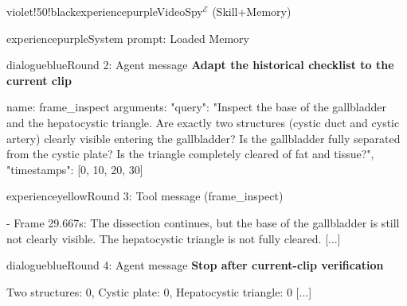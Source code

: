 \begin{ExecutionBox}[breakable,title after break={VideoSpy$^{\mathcal{E}}$ (Skill+Memory, continued)}]{violet!50!black}{experiencepurple}{VideoSpy$^{\mathcal{E}}$ (Skill+Memory)}
\begin{MessageBox}{experiencepurple}{System prompt: Loaded Memory}
\begin{Trajectory}
[...]
\end{Trajectory}
\end{MessageBox}
\begin{MessageBox}[agent message,frame hidden,borderline={1pt}{0pt}{changeaccent,dash pattern=on 3pt off 2pt},colbacktitle=red!4]{dialogueblue}{Round 2: Agent message}
\noindent\textcolor{changeaccent}{\textbf{Adapt the historical checklist to the current clip}}\par
\begin{Trajectory}
name: frame_inspect  arguments: {"query": "Inspect the base of the gallbladder and the hepatocystic triangle. Are exactly two structures (cystic duct and cystic artery) clearly visible entering the gallbladder? Is the gallbladder fully separated from the cystic plate? Is the triangle completely cleared of fat and tissue?", "timestamps": [0, 10, 20, 30]}
\end{Trajectory}
\end{MessageBox}
\begin{MessageBox}{experienceyellow}{Round 3: Tool message (frame\_inspect)}
\begin{Trajectory}
[...] - Frame 29.667s: The dissection continues, but the base of the gallbladder is still not clearly visible. The hepatocystic triangle is not fully cleared. [...]
\end{Trajectory}
\end{MessageBox}
\begin{MessageBox}[agent message,frame hidden,borderline={1pt}{0pt}{changeaccent,dash pattern=on 3pt off 2pt},colbacktitle=red!4]{dialogueblue}{Round 4: Agent message}
\noindent\textcolor{changeaccent}{\textbf{Stop after current-clip verification}}\par
\begin{Trajectory}
[...] Two structures: 0, Cystic plate: 0, Hepatocystic triangle: 0 [...]
\end{Trajectory}
\end{MessageBox}
\end{ExecutionBox}

